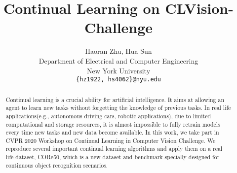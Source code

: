 \documentclass{article}
\title{Continual Learning on CLVision-Challenge}
\author{%
  Haoran Zhu, Hua Sun \\
  Department of Electrical and Computer Engineering\\
  New York University\\
  \texttt{\{hz1922, hs4062\}@nyu.edu} \\
}
\begin{document}

\maketitle

\begin{abstract}
 Continual learning is a crucial ability for artificial intelligence. It aims at allowing an agent to learn new tasks without forgetting the knowledge of previous tasks. In real life applications(e.g., autonomous driving cars, robotic applications), due to limited computational and storage resources, it is almost impossible to fully retrain models every time new tasks and new data become available. In this work, we take part in CVPR 2020 Workshop on Continual Learning in Computer Vision Challenge. We reproduce several important continual learning algorithms and apply them on a real life dataset, CORe50, which is a new dataset and benchmark specially designed for continuous object recognition scenarios.  
\end{abstract}









\end{document}
